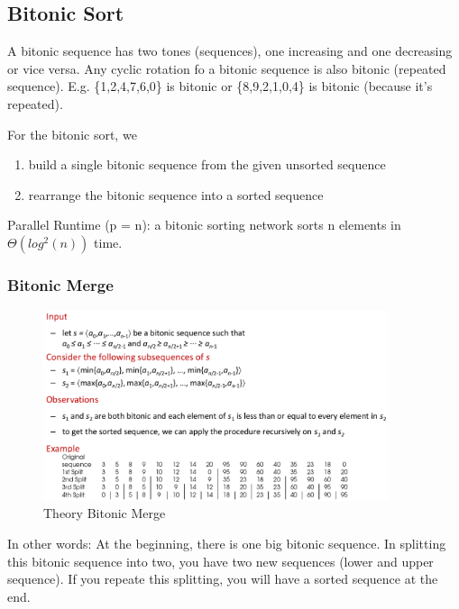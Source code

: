 \clearpage
\hypertarget{bitonic-sort}{%
\subsection{Bitonic Sort}\label{bitonic-sort}}

A bitonic sequence has two tones (sequences), one increasing and one
decreasing or vice versa. Any cyclic rotation fo a bitonic sequence is
also bitonic (repeated sequence). E.g. \{1,2,4,7,6,0\} is bitonic or
\{8,9,2,1,0,4\} is bitonic (because it's repeated).

For the bitonic sort, we

\begin{enumerate}
\def\labelenumi{\arabic{enumi}.}
\tightlist
\item
  build a single bitonic sequence from the given unsorted sequence
\item
  rearrange the bitonic sequence into a sorted sequence
\end{enumerate}

Parallel Runtime (p = n): a bitonic sorting network sorts n elements in
$\Theta(log^2 (n))$ time.

\hypertarget{bitonic-merge}{%
\subsubsection{Bitonic Merge}\label{bitonic-merge}}

\begin{figure}[H]
\centering
\includegraphics[width=0.9\textwidth]{figures/bitonicSequenceTheory.png}
\caption{Theory Bitonic Merge}
\end{figure}

In other words: At the beginning, there is one big bitonic sequence. In
splitting this bitonic sequence into two, you have two new sequences
(lower and upper sequence). If you repeate this splitting, you will have
a sorted sequence at the end.

